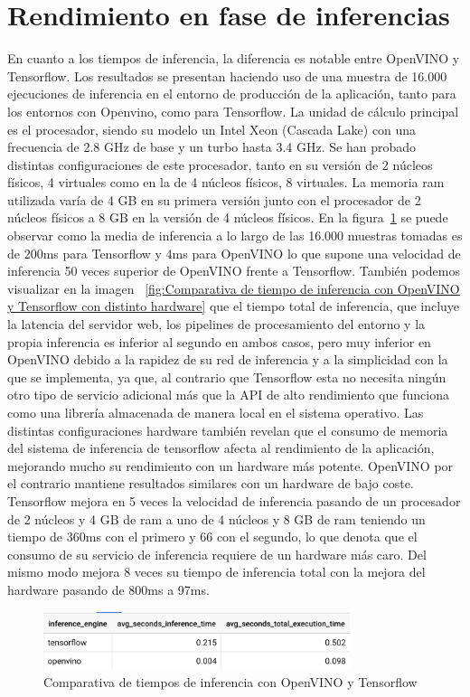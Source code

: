 \section{Rendimiento en fase de inferencias}\label{sec:ren-dimiento-en-fase-de-inferencias}
En cuanto a los tiempos de inferencia, la diferencia es notable entre OpenVINO y Tensorflow.
Los resultados se presentan haciendo uso de una muestra de 16.000 ejecuciones de inferencia en el entorno de producción de la aplicación, tanto para los entornos con Openvino, como para Tensorflow.
La unidad de cálculo principal es el procesador, siendo su modelo un Intel Xeon (Cascada Lake) con una frecuencia de 2.8 GHz de base y un turbo hasta 3.4 GHz.
Se han probado distintas configuraciones de este procesador, tanto en su versión de 2 núcleos físicos, 4 virtuales como en la de 4 núcleos físicos, 8 virtuales.
La memoria ram utilizada varía de 4 GB en su primera versión junto con el procesador de 2 núcleos físicos a 8 GB en la versión de 4 núcleos físicos.
En la figura~\ref{fig:Comparativa de tiempo de inferencia con OpenVINO y Tensorflow} se puede observar como la media de inferencia a lo largo de las 16.000 muestras tomadas
es de 200ms para Tensorflow y 4ms para OpenVINO lo que supone una velocidad de inferencia 50 veces superior de OpenVINO frente a Tensorflow.
También podemos visualizar en la imagen ~\ref{fig:Comparativa de tiempo de inferencia con OpenVINO y Tensorflow con distinto hardware} que el tiempo total de inferencia,
que incluye la latencia del servidor web, los pipelines de procesamiento del entorno y la propia inferencia es inferior al segundo en ambos casos,
pero muy inferior en OpenVINO debido a la rapidez de su red de inferencia y a la simplicidad con la que se implementa, ya que, al contrario que Tensorflow esta no necesita ningún otro tipo de servicio adicional más
que la API de alto rendimiento que funciona como una librería almacenada de manera local en el sistema operativo.
Las distintas configuraciones hardware también revelan que el consumo de memoria del sistema de inferencia de tensorflow afecta al rendimiento de la aplicación, mejorando mucho su rendimiento con un hardware más potente.
OpenVINO por el contrario mantiene resultados similares con un hardware de bajo coste.
Tensorflow mejora en 5 veces la velocidad de inferencia pasando de un procesador de 2 núcleos y 4 GB de ram a uno de 4 núcleos y 8 GB de ram teniendo un tiempo de 360ms con el primero y 66 con el segundo, lo que denota que el consumo
de su servicio de inferencia requiere de un hardware más caro.
Del mismo modo mejora 8 veces su tiempo de inferencia total con la mejora del hardware pasando de 800ms a 97ms.
\begin{figure}
    \centering
    \includegraphics[width=0.8\textwidth]{images/chapter5/time_inference_engine.png}
    \caption{Comparativa de tiempos de inferencia con OpenVINO y Tensorflow}
    \label{fig:Comparativa de tiempo de inferencia con OpenVINO y Tensorflow}
\end{figure}

